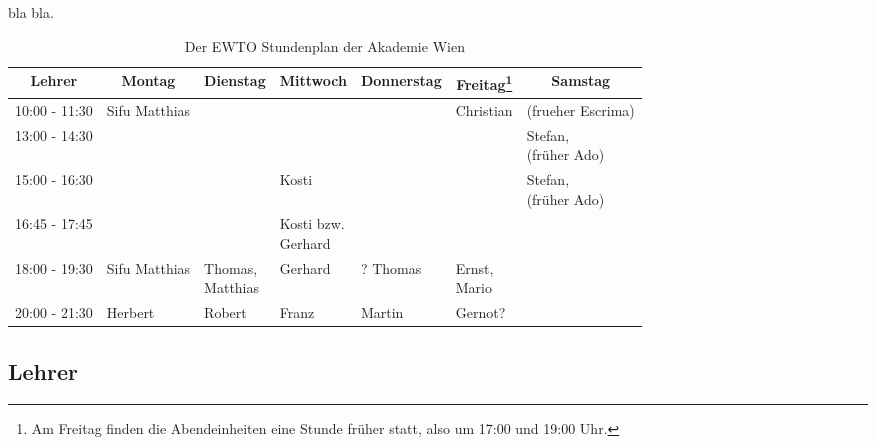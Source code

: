 bla bla.

\begin{table}[h]
	\centering
	\begin{tabular}{l|l|l|l|l|l|l}
		\multicolumn{1}{c|}{\textbf{Lehrer}} &
		\multicolumn{1}{c|}{\textbf{Montag}} &
		\multicolumn{1}{c|}{\textbf{Dienstag}} &
		\multicolumn{1}{c|}{\textbf{Mittwoch}} &
		\multicolumn{1}{c|}{\textbf{Donnerstag}} &
		\multicolumn{1}{c|}{\textbf{Freitag\footnote{Am Freitag finden die Abendeinheiten eine Stunde fr\"uher statt, also um 17:00 und 19:00 Uhr.}}} &
		\multicolumn{1}{c}{\textbf{Samstag}} \\ \hline \hline
		10:00 - 11:30 & Sifu Matthias & & & &
					Christian &
					(frueher Escrima) \\ \hline
		13:00 - 14:30 & & & & & &
					\WTcell{Stefan,\\(fr\"uher Ado)} \\ \hline
		15:00 - 16:30 & & & 
					Kosti & & &
					\WTcell{Stefan,\\(fr\"uher Ado)} \\ \hline
		16:45 - 17:45 & & &
					\WTcell{Kosti bzw.\\Gerhard} & & & \\ \hline
		18:00 - 19:30 &	Sifu Matthias &
					\WTcell{Thomas,\\Matthias} &
					Gerhard &
					? Thomas &
					\WTcell{Ernst,\\Mario} & \\ \hline
		20:00 - 21:30 & Herbert &
					Robert &
					Franz &
					Martin &
					Gernot? & \\
	\end{tabular}
	\caption{Der EWTO Stundenplan der Akademie Wien}
\end{table}


\subsection{Lehrer}
\newcommand{\WTEWTOLehrer}[3]{
	\begin{tabular}{ll}
		\WTXEWTOLehrerGraphic{#1} & \WTXEWTOLehrerText{\textbf{{\LARGE #2}}\\ #3} \\
	\end{tabular} \\
}
\newcommand{\WTXEWTOLehrerGraphic}[1]{\WTXCommonImageTop{\texttt{[image: resources/images/ewtolehrer/\#1]}}}
\newcommand{\WTXEWTOLehrerText}[1]{\raisebox{-0.8cm}{\parbox{0.7\linewidth}{#1}}}

